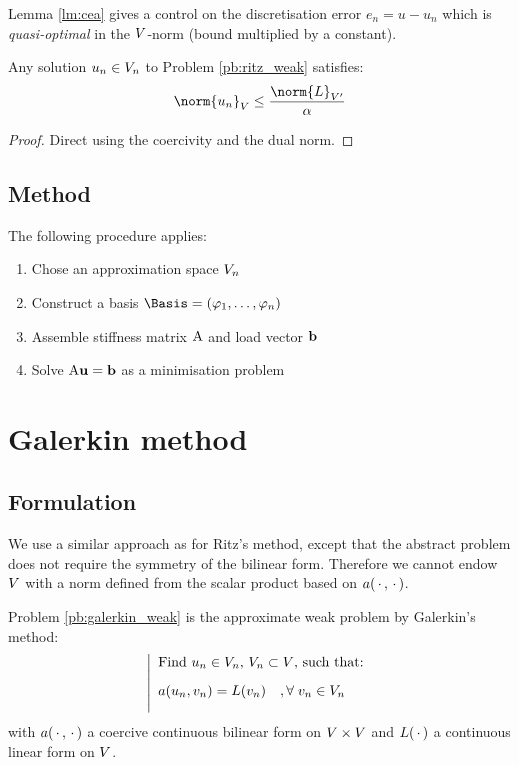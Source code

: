Lemma \eqref{lm:cea} gives a control on the discretisation error $e_n = u - u_n$ which is \textit{quasi-optimal} in the ${V}$-norm (\ie bound multiplied by a constant).

\begin{lmm}[Stability]\label{lm:stability_elliptic}
Any solution $u_n \in {V}_n$ to Problem \eqref{pb:ritz_weak} satisfies:
\begin{equation*}
\norm{u_n}_\xV  \leq \dfrac{\norm{L}_{\xV'}}{\alpha}
\end{equation*}
\end{lmm}
\begin{proof}
Direct using the coercivity and the dual norm.
\end{proof}

\subsection{Method}

\begin{lgrthm}\label{alg:ritz} The following procedure applies:
\begin{enumerate}
\item Chose an approximation space ${V}_n$
\item Construct a basis $\Basis= (\varphi_1,\dots,\varphi_n)$
\item Assemble stiffness matrix ${\mathrm A}$ and load vector $\mathbf b$
\item Solve ${\mathrm A} \mathbf u = \mathbf b$ as a minimisation problem
\end{enumerate}
\end{lgrthm}

\section{Galerkin method}

\subsection{Formulation}

We use a similar approach as for Ritz's method, except that the abstract problem does not require the symmetry of the bilinear form.
Therefore we cannot endow ${V}$ with a norm defined from the scalar product based on $a(\,{\mathbf\cdot}\,,\,{\mathbf\cdot}\,)$.

\medskip
Problem \eqref{pb:galerkin_weak} is the approximate weak problem by Galerkin's method:
\begin{equation}\label{pb:galerkin_weak}
\left\lvert
\begin{array}{ll}
\mbox{Find $u_n \in {V}_n$, ${V}_n \subset {V}$, such that:}\\[2ex]
a( u_n, v_n ) = L(v_n)\quad,{\forall\;}  v_n \in {V}_n\\[2ex]
\end{array}
\right .
\end{equation}
with $a(\,{\mathbf\cdot}\,,\,{\mathbf\cdot}\,)$ a coercive continuous bilinear form on ${V}\times{V}$ and $L(\,{\mathbf\cdot}\,)$ a continuous linear form on ${V}$.


